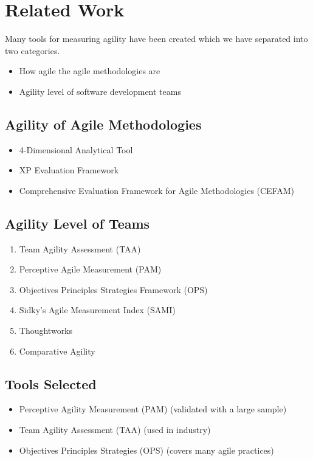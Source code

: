 \section{Related Work}

Many tools for measuring agility have been created which we have separated into two categories. 

\begin{itemize}
	\item How agile the agile methodologies are
	\item Agility level of software development teams
\end{itemize}

\subsection{Agility of Agile Methodologies}

\begin{itemize}
	\item 4-Dimensional Analytical Tool
	\item XP Evaluation Framework
	\item Comprehensive Evaluation Framework for Agile Methodologies (CEFAM)
\end{itemize}

\subsection{Agility Level of Teams}

\begin{enumerate}
	\item Team Agility Assessment (TAA)
	\item Perceptive Agile Measurement (PAM)
	\item Objectives Principles Strategies Framework (OPS)
	\item Sidky's Agile Measurement Index (SAMI)
	\item Thoughtworks
	\item Comparative Agility
\end{enumerate}

\subsection{Tools Selected}

\begin{itemize}
	\item Perceptive Agility Measurement (PAM) \cite{pam} ({\footnotesize validated with a large sample})
	\item Team Agility Assessment (TAA) \cite{Leffingwell} ({\footnotesize used in industry})
	\item Objectives Principles Strategies (OPS) \cite{sventha_dissertation} ({\footnotesize covers many agile practices})
\end{itemize}


\clearpage

